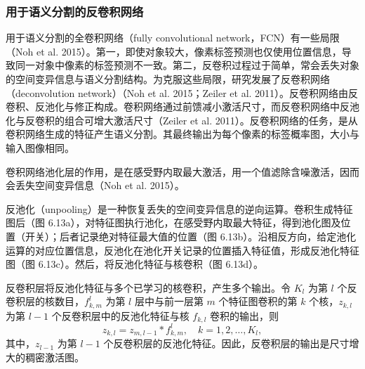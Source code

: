 \subsubsection{用于语义分割的反卷积网络}

用于语义分割的全卷积网络（fully convolutional network，FCN）有一些局限（Noh et al. 2015）。第一，即使对象较大，像素标签预测也仅使用位置信息，导致同一对象中像素的标签预测不一致。第二，反卷积过程过于简单，常会丢失对象的空间变异信息与语义分割结构。为克服这些局限，研究发展了反卷积网络（deconvolution network）（Noh et al. 2015；Zeiler et al. 2011）。反卷积网络由反卷积、反池化与修正构成。卷积网络通过前馈减小激活尺寸，而反卷积网络中反池化与反卷积的组合可增大激活尺寸（Zeiler et al. 2011）。反卷积网络的任务，是从卷积网络生成的特征产生语义分割。其最终输出为每个像素的标签概率图，大小与输入图像相同。


卷积网络池化层的作用，是在感受野内取最大激活，用一个值滤除含噪激活，因而会丢失空间变异信息（Noh et al. 2015）。


反池化（unpooling）是一种恢复丢失的空间变异信息的逆向运算。卷积生成特征图后（图 6.13a），对特征图执行池化，在感受野内取最大特征，得到池化图及位置（开关）；后者记录绝对特征最大值的位置（图 6.13b）。沿相反方向，给定池化运算的对应位置信息，反池化在池化开关记录的位置插入特征值，形成反池化特征图（图 6.13c）。然后，将反池化特征与核卷积（图 6.13d）。



反卷积层将反池化特征与多个已学习的核卷积，产生多个输出。令 $K_l$ 为第 $l$ 个反卷积层的核数目，$f_{k,m}^l$ 为第 $l$ 层中与前一层第 $m$ 个特征图卷积的第 $k$ 个核，$z_{k,l}$ 为第 $l-1$ 个反卷积层中的反池化特征与核 $f_{k,l}$ 卷积的输出，则
\begin{equation}
z_{k,l}=z_{m,l-1}*f_{k,m}^l,\quad k=1,2,\ldots,K_l,
\tag{6.150}
\end{equation}
其中，$z_{l-1}$ 为第 $l-1$ 个反卷积层的反池化特征。因此，反卷积层的输出是尺寸增大的稠密激活图。


